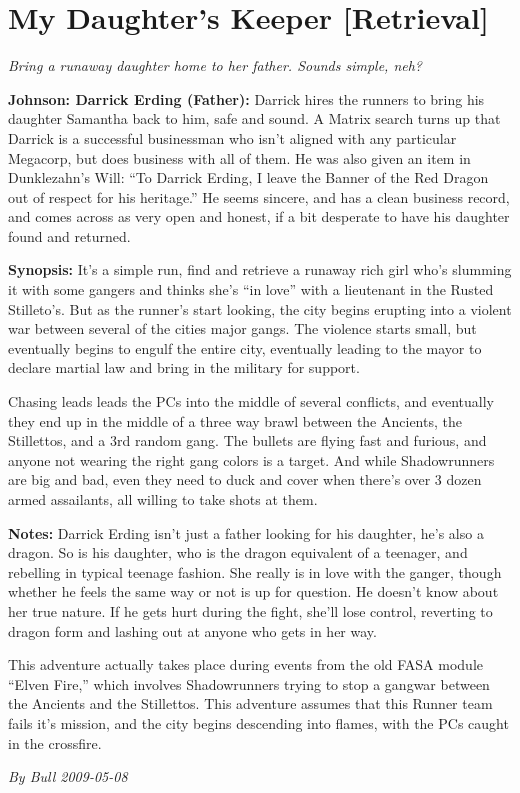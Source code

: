 \documentclass[letterpaper,twocolumn,10.5pt]{article}
\newenvironment{scenario}[6]
	{
		\section{#1 {\small[#2]}}
		\textit{#3}
		\def\TMPSCENARIO{#4 #5}
	}
	{\small\textit{By \TMPSCENARIO}}
\newcommand{\johnson}[2]{\textbf{Johnson: #1 (#2):}}
\newcommand{\synopsis}{\textbf{Synopsis: }}
\newcommand{\notes}{\textbf{Notes: }}
\begin{document}
\begin{scenario}{My Daughter's Keeper}
	{Retrieval}
	{ Bring a runaway daughter home to her father. Sounds simple, neh?}
	{Bull}
	{2009-05-08}
	{https://forum.rpg.net/showthread.php?321504-Shadowrun-4th-101-Instant-Scenarios\&p=10333900#post10333900}

\johnson{Darrick Erding}{Father}  Darrick hires the runners to bring his daughter Samantha back to him, safe and sound. A Matrix search turns up that Darrick is a successful businessman who isn't aligned with any particular Megacorp, but does business with all of them. He was also given an item in Dunklezahn's Will: ``To Darrick Erding, I leave the Banner of the Red Dragon out of respect for his heritage.'' He seems sincere, and has a clean business record, and comes across as very open and honest, if a bit desperate to have his daughter found and returned.

\synopsis  It's a simple run, find and retrieve a runaway rich girl who's slumming it with some gangers and thinks she's ``in love'' with a lieutenant in the Rusted Stilleto's. But as the runner's start looking, the city begins erupting into a violent war between several of the cities major gangs. The violence starts small, but eventually begins to engulf the entire city, eventually leading to the mayor to declare martial law and bring in the military for support.

Chasing leads leads the PCs into the middle of several conflicts, and eventually they end up in the middle of a three way brawl between the Ancients, the Stillettos, and a 3rd random gang. The bullets are flying fast and furious, and anyone not wearing the right gang colors is a target. And while Shadowrunners are big and bad, even they need to duck and cover when there's over 3 dozen armed assailants, all willing to take shots at them.

\notes Darrick Erding isn't just a father looking for his daughter, he's also a dragon. So is his daughter, who is the dragon equivalent of a teenager, and rebelling in typical teenage fashion. She really is in love with the ganger, though whether he feels the same way or not is up for question. He doesn't know about her true nature. If he gets hurt during the fight, she'll lose control, reverting to dragon form and lashing out at anyone who gets in her way.

This adventure actually takes place during events from the old FASA module ``Elven Fire,'' which involves Shadowrunners trying to stop a gangwar between the Ancients and the Stillettos. This adventure assumes that this Runner team fails it's mission, and the city begins descending into flames, with the PCs caught in the crossfire.


\end{scenario}
\end{document}

